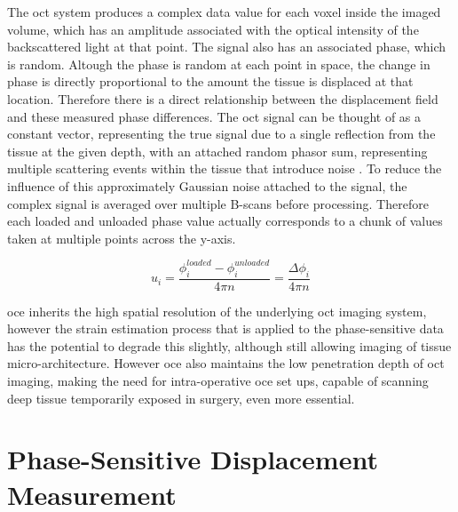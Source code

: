 The \ac{oct} system produces a complex data value for each voxel inside the imaged volume, which has an amplitude associated with the optical intensity of the backscattered light at that point. The signal also has an associated phase, which is random. Altough the phase is random at each point in space, the change in phase is directly proportional to the amount the tissue is displaced at that location. Therefore there is a direct relationship between the displacement field and these measured phase differences.
The \ac{oct} signal can be thought of as a constant vector, representing the true signal due to a single reflection from the tissue at the given depth, with an attached random phasor sum, representing multiple scattering events within the tissue that introduce noise \cite{goodman_statistical_2015}. To reduce the influence of this approximately Gaussian noise attached to the signal, the complex signal is averaged over multiple B-scans before processing. Therefore each loaded and unloaded phase value actually corresponds to a chunk of values taken at multiple points across the y-axis. 

\begin{equation}
u_i = \frac{\phi_i^{loaded}-\phi_i^{unloaded}}{4\pi n} = \frac{\Delta\phi_i}{4\pi n}
\end{equation}

\ac{oce} inherits the high spatial resolution of the underlying \ac{oct} imaging system, however the strain estimation process that is applied to the phase-sensitive data has the potential to degrade this slightly, although still allowing imaging of tissue micro-architecture. However \ac{oce} also maintains the low penetration depth of \ac{oct} imaging, making the need for intra-operative \ac{oce} set ups, capable of scanning deep tissue temporarily exposed in surgery, even more essential. 

\section{Phase-Sensitive Displacement Measurement}\label{phase_sensitive}

